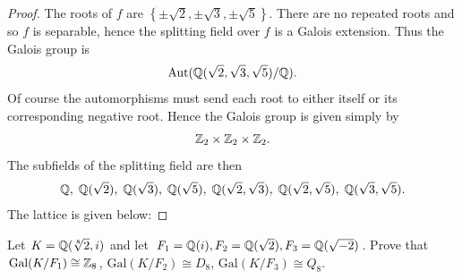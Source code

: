 \documentclass[num=11,duedate=04-21-21,course=Algebra\ II,proflastname=Walton]{hwtemplate}
\begin{document}
\begin{proof}
	The roots of \(f\) are \(\left\{ \pm \sqrt{2} , \pm \sqrt{3} , \pm \sqrt{5}  \right\} \). There are no repeated roots and so \(f\) is separable, hence the splitting field over \(f\) is a Galois extension. Thus the Galois group is
	\begin{align*}
		\textrm{Aut}(\mathbb{Q}(\sqrt{2} ,\sqrt{3} ,\sqrt{5} ) / \mathbb{Q}).
	\end{align*}
	Of course the automorphisms must send each root to either itself or its corresponding negative root. Hence the Galois group is given simply by
	\begin{align*}
		\mathbb{Z}_2 \times \mathbb{Z}_2 \times \mathbb{Z}_2.
	\end{align*}
	The subfields of the splitting field are then
	\begin{align*}
	\mathbb{Q},\; \mathbb{Q}(\sqrt{2} ),\; \mathbb{Q}(\sqrt{3} ),\;\mathbb{Q}(\sqrt{5} ),\; \mathbb{Q}(\sqrt{2} ,\sqrt{3} ),\; \mathbb{Q}(\sqrt{2} ,\sqrt{5} ),\; \mathbb{Q}(\sqrt{3} ,\sqrt{5} ).
	\end{align*}
	The lattice is given below:

%     
\end{proof}

\problem[2]
\begin{claim} %
	Let \(K = \mathbb{Q}(\sqrt[8]{2} ,i)\) and let \(F_1 = \mathbb{Q}(i), F_2 = \mathbb{Q}(\sqrt{2} ), F_3 = \mathbb{Q}(\sqrt{-2} )\). Prove that \(\textrm{Gal}(K / F_1) \cong \mathbb{Z}_{8}\), \(\textrm{Gal}(K / F_2) \cong D_8\), \(\textrm{Gal}(K /F_3) \cong Q_8\).
\end{claim}
\end{document}
